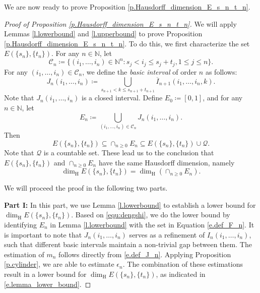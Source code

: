 \documentclass[12pt,reqno]{amsart}
\renewcommand{\=}{\coloneqq}
\theoremstyle{plain}
\begin{document}
We are now ready to prove Proposition \ref{p.Hausdorff_dimension_E_s_n_t_n}.
\begin{proof}[Proof of Proposition \ref{p.Hausdorff_dimension_E_s_n_t_n}]
We will apply Lemmas \ref{l.lowerbound} and \ref{l.upperbound} to prove Proposition \ref{p.Hausdorff_dimension_E_s_n_t_n}. To do this, we first characterize the set $E(\{s_n\},\{t_n\})$.
For any $n \in \mathbb N$, let
\begin{equation}\label{e.def_C_n}
                \mathcal{C} _{n}\coloneqq \{
                (i_1, \dots,i_{n})\in
                \mathbb{N}^n:s_j<i_{j}\leq s_j+t_j,
               1\leq j\leq n
                \}.
        \end{equation}
For any $(i_1, \dots, i_{n})\in \mathcal{C}_{n}$, we define the \textit{basic interval} of order $n$ as follows:
        \begin{equation}\label{e.def_J_n}
                J_n(i_1, \dots, i_{n})
                \coloneqq \bigcup_
                {s_{n+1}<k\leq s_{n+1}+t_{n+1}} \overline{I}_{n+1}(i_1, \dots, i_{n}, k).
        \end{equation}
Note that $J_n(i_1, \dots, i_{n})$ is a closed interval. Define $E_0\coloneqq [0,1]$, and for any $n \in \mathbb N$, let
        \begin{equation}\label{e.def_F_n}
                E_n\coloneqq
                \bigcup_{(i_1, \dots, i_{n})\in
                        \mathcal{C} _{n}}
                J_n(i_1, \dots, i_{n}).
        \end{equation}
Then
\begin{equation*}\label{equ:esntn}
E(\{s_n\},\{t_n\}) \subseteq \cap_{n\geq 0}E_n \subseteq E(\{s_n\},\{t_n\}) \cup \mathcal{Q}.
\end{equation*}
Note that $\mathcal{Q}$ is a countable set. These lead us to the conclusion that $E(\{s_n\},\{t_n\})$ and $\cap_{n\geq 0}E_n$ have the same Hausdorff dimension, namely
\begin{equation}\label{equ:dengshi}
\dim_{\mathrm{H}} E(\{s_n\},\{t_n\}) = \dim_{\mathrm{H}}(\cap_{n\geq 0}E_n).
\end{equation}

We will proceed the proof in the following two parts.

\textbf{Part I:} In this part, we use Lemma \ref{l.lowerbound} to establish a lower bound for $\dim_{\mathrm{H}} E(\{s_n\},\{t_n\})$. Based on \eqref{equ:dengshi}, we do the lower bound by identifying $E_n$ in Lemma \ref{l.lowerbound} with the set in Equation \eqref{e.def_F_n}.
It is important to note that $J_n(i_1, \dots, i_{n})$ serves as a refinement of $I_n(i_1, \dots, i_{n})$, such that different basic intervals maintain a non-trivial gap between them. The estimation of $m_n$ follows directly from \eqref{e.def_J_n}. Applying Proposition \ref{p.cylinder}, we are able to estimate $\epsilon_n$. The combination of these estimations result in a lower bound for $\dim_{\mathrm{H}} E(\{s_n\},\{t_n\})$, as indicated in \eqref{e.lemma_lower_bound}.



\end{proof}
\end{document}
